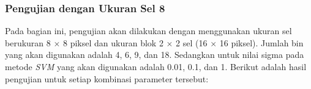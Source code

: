 \subsubsection{Pengujian dengan Ukuran Sel 8}
\noindent Pada bagian ini, pengujian akan dilakukan dengan menggunakan ukuran sel berukuran 8 $\times$ 8 piksel dan ukuran blok 2 $\times$ 2 sel (16 $\times$ 16 piksel). Jumlah bin yang akan digunakan adalah 4, 6, 9, dan 18. Sedangkan untuk nilai sigma pada metode \textit{SVM} yang akan digunakan adalah 0.01, 0.1, dan 1. Berikut adalah hasil pengujian untuk setiap kombinasi parameter tersebut:
